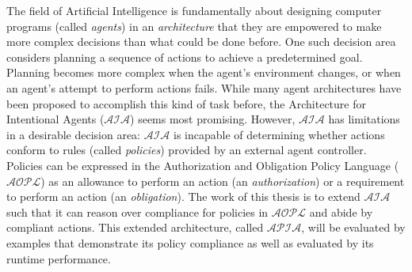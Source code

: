 
The field of Artificial Intelligence is fundamentally about designing computer programs (called \textit{agents}) in an \textit{architecture} that they are empowered to make more complex decisions than what could be done before.
One such decision area considers planning a sequence of actions to achieve a predetermined goal.
Planning becomes more complex when the agent's environment changes, or when an agent's attempt to perform actions fails.
While many agent architectures have been proposed to accomplish this kind of task before, the Architecture for Intentional Agents ($\mathcal{AIA}$) seems most promising.
However, $\mathcal{AIA}$ has limitations in a desirable decision area: $\mathcal{AIA}$ is incapable of determining whether actions conform to rules (called \textit{policies}) provided by an external agent controller.
Policies can be expressed in the Authorization and Obligation Policy Language ($\mathcal{AOPL}$) as an allowance to perform an action (an \textit{authorization}) or a requirement to perform an action (an \textit{obligation}).
The work of this thesis is to extend $\mathcal{AIA}$ such that it can reason over compliance for policies in $\mathcal{AOPL}$ and abide by compliant actions.
This extended architecture, called $\mathcal{APIA}$, will be evaluated by examples that demonstrate its policy compliance as well as evaluated by its runtime performance.
